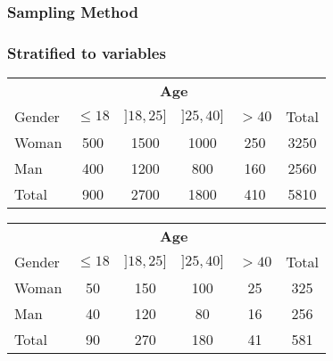 \documentclass[aspectratio=169]{beamer}
\begin{document}
\begin{frame}
  \frametitle{Sampling Method}
  \begin{center}
  \end{center}
  
\end{frame}

\begin{frame}
  \frametitle{Stratified to variables}
  
  \begin{center}
    \begin{tabular}{l|cccc|c}
      & \multicolumn{4}{c|}{\textbf{Age}} & \\
      Gender & $\le 18$ & $]18,25]$ & $]25, 40]$ & $> 40$ & Total\\
      \hline
      Woman & 500 & 1500 & 1000 & 250 & 3250 \\
      Man   & 400 & 1200 & 800 & 160 & 2560\\
      \hline
      Total & 900 & 2700 & 1800 & 410 & 5810
    \end{tabular}
    
    \vspace{.5cm}
    
    \pause
    \begin{tabular}{l|cccc|c}
      & \multicolumn{4}{c|}{\textbf{Age}} & \\
      Gender & $\le 18$ & $]18,25]$ & $]25, 40]$ & $> 40$ & Total\\
      \hline
      Woman & 50 & 150 & 100 & 25 & 325 \\
      Man   & 40 & 120 & 80 & 16 & 256\\
      \hline
      Total & 90 & 270 & 180 & 41 & 581
    \end{tabular}
    
  \end{center}
\end{frame}
\end{document}
